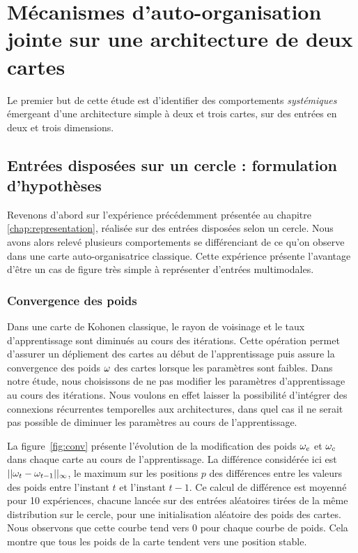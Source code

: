 \documentclass[../main]{subfiles}
\begin{document}
\section{Mécanismes d'auto-organisation jointe sur une architecture de deux cartes}

Le premier but de cette étude est d'identifier des comportements \emph{systémiques} émergeant d'une architecture simple à deux et trois cartes, sur des entrées en deux et trois dimensions.

\subsection{Entrées disposées sur un cercle : formulation d'hypothèses}

Revenons d'abord sur l'expérience précédemment présentée au chapitre \ref{chap:representation}, réalisée sur des entrées disposées selon un cercle.
Nous avons alors relevé plusieurs comportements se différenciant de ce qu'on observe dans une carte auto-organisatrice classique. 
Cette expérience présente l'avantage d'être un cas de figure très simple à représenter d'entrées multimodales.

\subsubsection{Convergence des poids}

Dans une carte de Kohonen classique, le rayon de voisinage et le taux d'apprentissage sont diminués au cours des itérations. Cette opération permet d'assurer un dépliement des cartes au début de l'apprentissage puis assure la convergence des poids $\omega$ des cartes lorsque les paramètres sont faibles.
Dans notre étude, nous choisissons de ne pas modifier les paramètres d'apprentissage au cours des itérations. Nous voulons en effet laisser la possibilité d'intégrer des connexions récurrentes temporelles aux architectures, dans quel cas il ne serait pas possible de diminuer les paramètres au cours de l'apprentissage.


La figure~\ref{fig:conv} présente l'évolution de la modification des poids $\omega_{e}$ et $\omega_{c}$ dans chaque carte au cours de l'apprentissage. La différence considérée ici est $||\omega_t - \omega_{t-1}||_{\infty}$, le maximum sur les positions $p$ des différences entre les valeurs des poids entre l'instant $t$ et l'instant $t-1$. 
Ce calcul de différence est moyenné pour 10 expériences, chacune lancée sur des entrées aléatoires tirées de la même distribution sur le cercle, pour une initialisation aléatoire des poids des cartes.
Nous observons que cette courbe tend vers $0$ pour chaque courbe de poids. Cela montre que tous les poids de la carte tendent vers une position stable.
\end{document}

